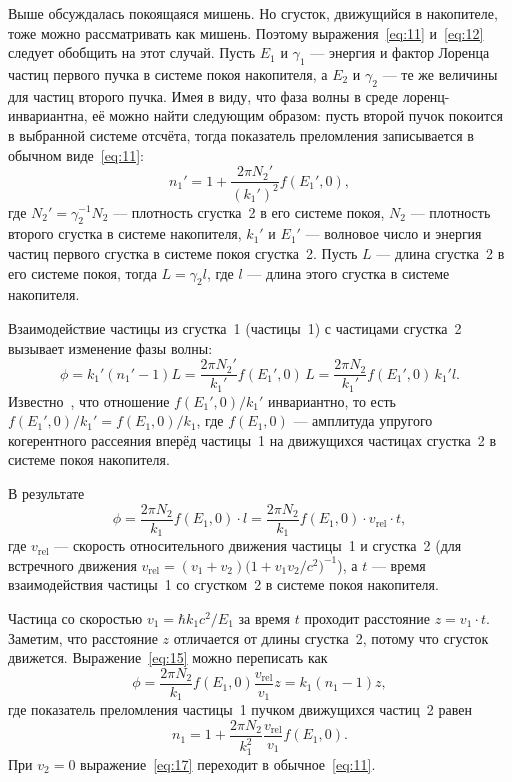 \documentclass[11pt,a4paper]{article}
\begin{document}
Выше обсуждалась покоящаяся мишень. Но сгусток, движущийся в накопителе,
тоже можно рассматривать как мишень. Поэтому выражения~\eqref{eq:11}
и~\eqref{eq:12} следует обобщить на этот случай. Пусть $E_1$ и $\gamma_1$
--- энергия и фактор Лоренца частиц первого пучка в системе покоя
накопителя, а $E_2$ и $\gamma_2$ --- те же величины для частиц второго
пучка. Имея в виду, что фаза волны в среде лоренц-инвариантна, её можно
найти следующим образом: пусть второй пучок покоится в выбранной системе
отсчёта, тогда показатель преломления записывается в обычном виде~\eqref{eq:11}:
\begin{equation}
n_1'=1+\frac{2\pi N_2'}{(k_1')^2}f(E_1',0),
\label{eq:13}
\end{equation}
где $N_2'=\gamma_2^{-1}N_2$ --- плотность сгустка~2 в его системе покоя,
$N_2$ --- плотность второго сгустка в системе накопителя, $k_1'$ и $E_1'$
--- волновое число и энергия частиц первого сгустка в системе покоя
сгустка~2. Пусть $L$ --- длина сгустка~2 в его системе покоя, тогда
$L=\gamma_2 l$, где $l$ --- длина этого сгустка в системе накопителя.

Взаимодействие частицы из сгустка~1 (частицы~1) с частицами сгустка~2
вызывает изменение фазы волны:
\begin{equation}
\phi=k_1'(n_1'-1)L
=\frac{2\pi N_2'}{k_1'}f(E_1',0)\,L
=\frac{2\pi N_2}{k_1'}f(E_1',0)\,k_1' l.
\label{eq:14}
\end{equation}
Известно~\cite{Goldberger64}, что отношение $f(E_1',0)/k_1'$ инвариантно,
то есть $f(E_1',0)/k_1'=f(E_1,0)/k_1$, где $f(E_1,0)$ --- амплитуда
упругого когерентного рассеяния вперёд частицы~1 на движущихся частицах
сгустка~2 в системе покоя накопителя.

В результате
\begin{equation}
\phi=\frac{2\pi N_2}{k_1}f(E_1,0)\cdot l
=\frac{2\pi N_2}{k_1}f(E_1,0)\cdot v_{\mathrm{rel}}\cdot t,
\label{eq:15}
\end{equation}
где $v_{\mathrm{rel}}$ --- скорость относительного движения частицы~1
и сгустка~2 (для встречного движения
$v_{\mathrm{rel}}=(v_1+v_2)\bigl(1+v_1 v_2/c^2\bigr)^{-1}$),
а $t$ --- время взаимодействия частицы~1 со сгустком~2 в системе покоя
накопителя.

Частица со скоростью $v_1=\hbar k_1 c^2/E_1$ за время $t$ проходит
расстояние $z=v_1\cdot t$. Заметим, что расстояние $z$ отличается
от длины сгустка~2, потому что сгусток движется. Выражение~\eqref{eq:15}
можно переписать как
\begin{equation}
\phi=\frac{2\pi N_2}{k_1}f(E_1,0)\frac{v_{\mathrm{rel}}}{v_1}z
=k_1(n_1-1)z,
\label{eq:16}
\end{equation}
где показатель преломления частицы~1 пучком движущихся частиц~2 равен
\begin{equation}
n_1=1+\frac{2\pi N_2}{k_1^2}\frac{v_{\mathrm{rel}}}{v_1}f(E_1,0).
\label{eq:17}
\end{equation}
При $v_2=0$ выражение~\eqref{eq:17} переходит в обычное~\eqref{eq:11}.
\end{document}

